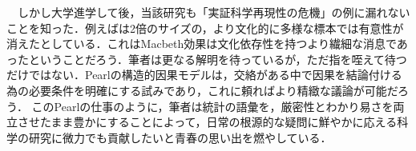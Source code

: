 \documentclass[uplatex, dvipdfmx]{jsarticle}
\begin{document}
\begin{description}
    　しかし大学進学して後，当該研究も「実証科学再現性の危機」の例に漏れないことを知った．例えば\cite{14-AntiLadyMacbeth}は2倍のサイズの，より文化的に多様な標本では有意性が消えたとしている．これはMacbeth効果は文化依存性を持つより繊細な消息であったということだろう．筆者は更なる解明を待っているが，ただ指を咥えて待つだけではない．Pearlの構造的因果モデルは，交絡がある中で因果を結論付ける為の必要条件を明確にする試みであり，これに頼ればより精緻な議論が可能だろう．
    このPearlの仕事のように，筆者は統計の語彙を，厳密性とわかり易さを両立させたまま豊かにすることによって，日常の根源的な疑問に鮮やかに応える科学の研究に微力でも貢献したいと青春の思い出を燃やしている．
\end{description}

\small

\end{document}
